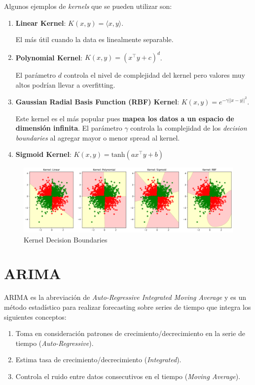 Algunos ejemplos de \textit{kernels} que se pueden utilizar son: 

\begin{enumerate}
    \item \textbf{Linear Kernel}: $K(x,y) = \langle x , y \rangle$. 
    
    El más útil cuando la data es linealmente separable. 
    \item \textbf{Polynomial Kernel}: $K(x,y) = (x^{\top}y + c)^d$. 
    
    El parámetro $d$ controla el nivel de complejidad del kernel pero valores muy altos podrían llevar a overfitting.
    \item \textbf{Gaussian Radial Basis Function (RBF) Kernel}: $K(x,y) = e^{-\gamma||x-y||^2}$. 
    
    Este kernel es el más popular pues \textbf{mapea los datos a un espacio de dimensión infinita}. El parámetro $\gamma$ controla la complejidad de los \textit{decision boundaries} al agregar mayor o menor spread al kernel. 
    \item \textbf{Sigmoid Kernel}: $K(x,y) = \text{tanh}(ax^{\top}y + b)$
\end{enumerate}

\begin{figure}[H]
    \center
    \includegraphics[scale=0.35]{notebooks/ML/img/kernel_decision_boundaries.png}
    \caption{Kernel Decision Boundaries}
\end{figure}

\section{ARIMA}

ARIMA es la abreviación de \textit{Auto-Regressive Integrated Moving Average} y es un método estadístico para realizar forecasting sobre series de tiempo que integra los siguientes conceptos:

\begin{enumerate}
    \item Toma en consideración patrones de crecimiento/decrecimiento en la serie de tiempo (\textit{Auto-Regressive}). 
    \item Estima tasa de crecimiento/decrecimiento (\textit{Integrated}).
    \item Controla el ruido entre datos consecutivos en el tiempo (\textit{Moving Average}).
\end{enumerate}


